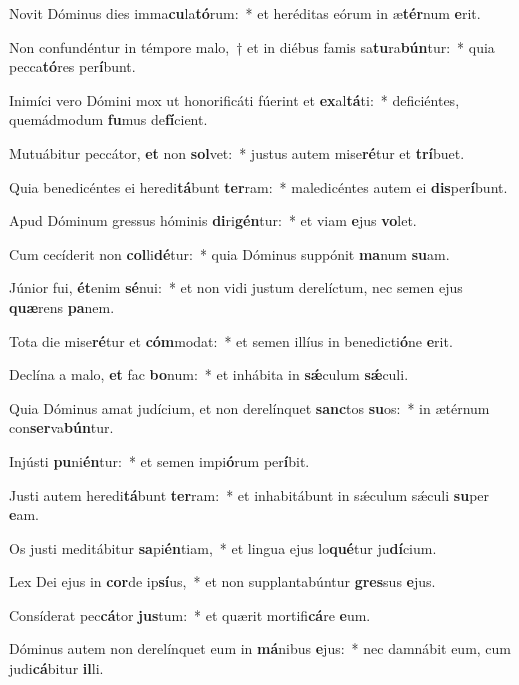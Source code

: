 \item Novit Dóminus dies imma\textbf{cu}la\textbf{tó}rum:~* et heréditas eórum in æ\textbf{tér}num \textbf{e}rit.
\item Non confundéntur in témpore malo,~† et in diébus famis sa\textbf{tu}ra\textbf{bún}tur:~* quia pecca\textbf{tó}res per\textbf{í}bunt.
\item Inimíci vero Dómini mox ut honorificáti fúerint et \textbf{ex}al\textbf{tá}ti:~* deficiéntes, quemádmodum \textbf{fu}mus de\textbf{fí}cient.
\item Mutuábitur peccátor, \textbf{et} non \textbf{sol}vet:~* justus autem mise\textbf{ré}tur et \textbf{trí}buet.
\item Quia benedicéntes ei heredi\textbf{tá}bunt \textbf{ter}ram:~* maledicéntes autem ei \textbf{dis}per\textbf{í}bunt.
\item Apud Dóminum gressus hóminis \textbf{di}ri\textbf{gén}tur:~* et viam \textbf{e}jus \textbf{vo}let.
\item Cum cecíderit non \textbf{col}li\textbf{dé}tur:~* quia Dóminus suppónit \textbf{ma}num \textbf{su}am.
\item Júnior fui, \textbf{ét}enim \textbf{sé}nui:~* et non vidi justum derelíctum, nec semen ejus \textbf{quæ}rens \textbf{pa}nem.
\item Tota die mise\textbf{ré}tur et \textbf{cóm}modat:~* et semen illíus in benedicti\textbf{ó}ne \textbf{e}rit.
\item Declína a malo, \textbf{et} fac \textbf{bo}num:~* et inhábita in \textbf{sǽ}culum \textbf{sǽ}culi.
\item Quia Dóminus amat judícium, et non derelínquet \textbf{sanc}tos \textbf{su}os:~* in ætérnum con\textbf{ser}va\textbf{bún}tur.
\item Injústi \textbf{pu}ni\textbf{én}tur:~* et semen impi\textbf{ó}rum per\textbf{í}bit.
\item Justi autem heredi\textbf{tá}bunt \textbf{ter}ram:~* et inhabitábunt in sǽculum sǽculi \textbf{su}per \textbf{e}am.
\item Os justi meditábitur \textbf{sa}pi\textbf{én}tiam,~* et lingua ejus lo\textbf{qué}tur ju\textbf{dí}cium.
\item Lex Dei ejus in \textbf{cor}de ip\textbf{sí}us,~* et non supplantabúntur \textbf{gres}sus \textbf{e}jus.
\item Consíderat pec\textbf{cá}tor \textbf{jus}tum:~* et quærit mortifi\textbf{cá}re \textbf{e}um.
\item Dóminus autem non derelínquet eum in \textbf{má}nibus \textbf{e}jus:~* nec damnábit eum, cum judi\textbf{cá}bitur \textbf{il}li.
